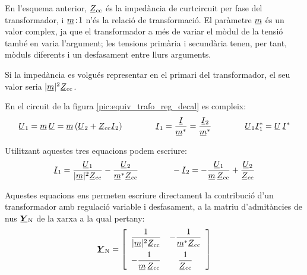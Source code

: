 En l'esquema anterior, $\cmplx{Z}\ped{cc}$ és la impedància de curtcircuit per fase del transformador, i $\cmplx{m}\!:\!1$ n'és la
relació de transformació. El paràmetre $\cmplx{m}$ és un valor
complex, ja que el transformador a més de variar el mòdul de la
tensió també en varia  l'argument; les tensions primària i
secundària tenen, per tant,   mòduls diferents i un desfasament entre llurs arguments.

Si la impedància es volgués representar en el primari del
transformador, el seu valor seria $|\cmplx{m}|^2 \cmplx{Z}\ped{cc}$.

En el circuit de la figura \vref{pic:equiv_trafo_reg_decal} es
compleix: 
\begin{equation}
   \cmplx{U}_1 = \cmplx{m} \,\cmplx{U} = \cmplx{m}\,
   (\cmplx{U}_2+\cmplx{Z}\ped{cc}\cmplx{I}_2)
   \qquad\qquad
   \cmplx{I}_1 = \frac{\cmplx{I}}{\cmplx{m}^*} = \frac{\cmplx{I}_2}{\cmplx{m}^*}
   \qquad\qquad
   \cmplx{U}_1 \cmplx{I}_1^* = \cmplx{U} \,\cmplx{I}^*
\end{equation}

Utilitzant aquestes tres equacions podem escriure:
\begin{equation}
   \cmplx{I}_1 = \frac{\cmplx{U}_1}{|\cmplx{m}|^2 \cmplx{Z}\ped{cc}} - \frac{\cmplx{U}_2}
   {\cmplx{m}^* \cmplx{Z}\ped{cc}} \qquad\qquad
   - \cmplx{I}_2 = - \frac{\cmplx{U}_1}{\cmplx{m} \,\cmplx{Z}\ped{cc}} + \frac{\cmplx{U}_2}
   {\cmplx{Z}\ped{cc}}
\end{equation}

Aquestes equacions ens permeten escriure directament la
contribució d'un transformador amb regulació variable i desfasament, a
la matriu d'admitàncies de nus $\mcmplx{Y}\ped{N}$ de la xarxa a la
qual pertany: 
\begin{equation} \label{eq:yn_trafo_reg_decal}
   \mcmplx{Y}\ped{N} = 
   \begin{bmatrix}\begin{array}{cc} 
     \dfrac{1}{|\cmplx{m}|^2 \cmplx{Z}\ped{cc}} & - \dfrac{1}
   {\cmplx{m}^* \cmplx{Z}\ped{cc}} \\[2.5ex]
     - \dfrac{1}{\cmplx{m} \,\cmplx{Z}\ped{cc}} & \dfrac{1}
   {\cmplx{Z}\ped{cc}}
   \end{array}\end{bmatrix}
\end{equation}

